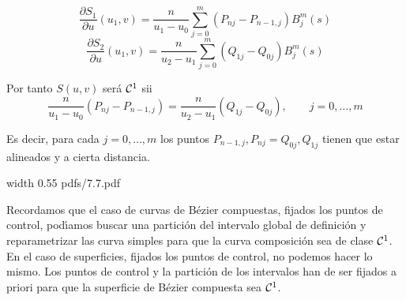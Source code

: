 \documentclass[twoside]{report}
\newcommand{\colocapdf}[2]{\quad\pdfimage width #2 {pdfs/#1.pdf}}
\begin{document}
$$\frac{\partial S_1}{\partial u}(u_1,v)= \frac{n}{u_1-u_0} \sum_{j=0}^{m} (P_{nj}-P_{n-1,j}) B_j^{m}(s)$$
$$\frac{\partial S_2}{\partial u}(u_1,v)= \frac{n}{u_2-u_1} \sum_{j=0}^{m} (Q_{1j}-Q_{0j}) B_j^{m}(s)$$

Por tanto $S(u,v)$ ser\'{a} ${\cal C}^1$ sii
$$\frac{n}{u_1-u_0}(P_{nj}-P_{n-1,j})= \frac{n}{u_2-u_1}(Q_{1j}-Q_{0j}), \quad \quad j=0,\ldots,m$$

Es decir, para cada $j=0,\ldots,m$ los puntos $P_{n-1,j}, P_{nj}=Q_{0j}, Q_{1j}$ tienen que estar alineados y a cierta distancia.

\begin{center}
\colocapdf{7.7}{0.55\textwidth}
\end{center}

Recordamos que el caso de curvas de B\'{e}zier compuestas, fijados los puntos de control, pod\'{\i}amos buscar una partici\'{o}n del intervalo global de definici\'{o}n y reparametrizar las curva simples para que la curva composici\'{o}n sea de clase ${\cal C}^1$. En el caso de superficies, fijados los puntos de control, no podemos hacer lo mismo. Los puntos de control y la partici\'{o}n de los intervalos han de ser fijados a priori para que la superficie de B\'{e}zier compuesta sea ${\cal C}^1$.
\end{document}
